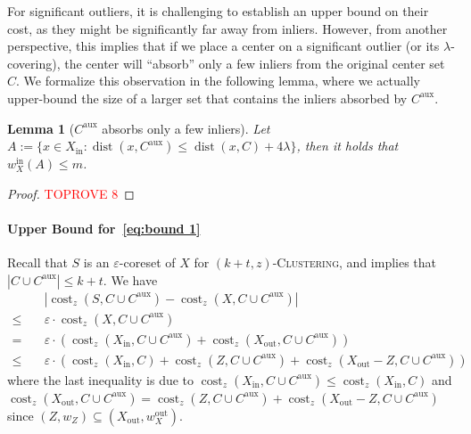 \documentclass[letterpaper,11pt]{article}
\theoremstyle{plain}
\newtheorem{lemma}[theorem]{Lemma}
\theoremstyle{definition}
\theoremstyle{remark}
\DeclareMathOperator{\cost}{cost}
\DeclareMathOperator{\dist}{dist}
\newcommand{\inl}{\mathrm{in}}
\newcommand{\out}{\mathrm{out}}
\newcommand{\eps}{\varepsilon}
\newcommand{\aux}{\mathrm{aux}}
\newcommand{\ProblemName}[1]{\textsc{#1}}
\newcommand{\tzC}[1]{\ProblemName{$(#1,z)$-Clustering}\xspace}
\begin{document}
For significant outliers, it is challenging to establish an upper bound on their cost, as they might be significantly far away from inliers. However, from another perspective, this implies that if we place a center on a significant outlier (or its $\lambda$-covering), the center will ``absorb'' only a few inliers from the original center set $C$. We formalize this observation in the following lemma, where we actually upper-bound the size of a larger set that contains the inliers absorbed by $C^\aux$.

\begin{lemma}[$C^\aux$ absorbs only a few inliers]
    \label{claim:for significant}
    Let $A:=\{x\in X_\inl: \dist(x,C^\aux)\le \dist(x,C) + 4\lambda \}$, then it holds that $w_X^\inl(A)\le m$.
\end{lemma}
\begin{proof}\textcolor{red}{TOPROVE 8}\end{proof}



\paragraph{Upper Bound for~\eqref{eq:bound 1}} Recall that $S$ is an $\eps$-coreset of $X$ for \tzC{k+t}, and  implies that $|C\cup C^\aux|\le k+t$. We have
\begin{equation}
    \label{eq:cost(S)-cost(X)}
    \begin{aligned}    
    &\quad\left|\cost_z(S,C\cup C^\aux) - \cost_z(X,C\cup C^\aux)\right| \\
    \le&\quad \eps\cdot \cost_z(X,C\cup C^\aux)\\
    =&\quad \eps\cdot\left(\cost_z(X_\inl,C\cup C^\aux) + \cost_z(X_\out,C\cup C^\aux) \right)\\
    \le&\quad \eps\cdot\left(\cost_z(X_\inl,C) + \cost_z(Z,C\cup C^\aux) + \cost_z(X_\out - Z,C\cup C^\aux) \right)
    \end{aligned}
\end{equation}
where the last inequality is due to $\cost_z(X_\inl,C\cup C^\aux)\le \cost_z(X_\inl,C)$ and $\cost_z(X_\out,C\cup C^\aux) = \cost_z(Z, C\cup C^\aux) + \cost_z(X_\out - Z,C\cup C^\aux)$ since $(Z,w_Z)\subseteq (X_\out,w_X^\out)$.
\end{document}
